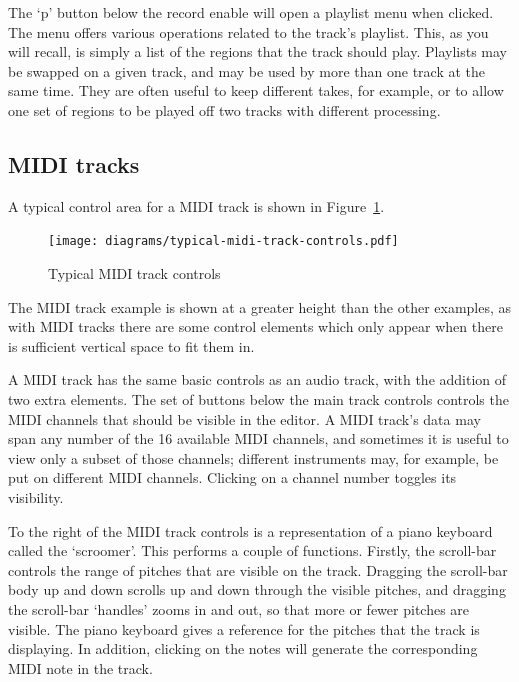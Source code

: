 \documentclass[10pt,a4paper]{book}
\newcommand{\todo}[1]{\marginpar{\small\texttt{#1}}}
\begin{document}
The `p' button below the record enable will open a playlist menu when
clicked.  The menu offers various operations related to the track's
playlist.  This, as you will recall, is simply a list of the
regions that the track should play.  Playlists may be swapped on a
given track, and may be used by more than one track at the same time.
They are often useful to keep different takes, for example, or to
allow one set of regions to be played off two tracks with different
processing.

\todo{playlist menu details}


\subsection{MIDI tracks}

A typical control area for a MIDI track is shown in Figure~\ref{fig:typical-midi-track-controls}.

\begin{figure}[ht]
\begin{center}
\texttt{[image: diagrams/typical-midi-track-controls.pdf]}
\end{center}
\caption{Typical MIDI track controls}
\label{fig:typical-midi-track-controls}
\end{figure}

The MIDI track example is shown at a greater height than the other
examples, as with MIDI tracks there are some control elements which
only appear when there is sufficient vertical space to fit them in.

A MIDI track has the same basic controls as an audio track, with the
addition of two extra elements.  The set of buttons below the main
track controls controls the MIDI channels that should be visible in
the editor.  A MIDI track's data may span any number of the 16
available MIDI channels, and sometimes it is useful to view only a
subset of those channels; different instruments may, for example, be
put on different MIDI channels.  Clicking on a channel number toggles
its visibility.

\todo{What does Force do}

To the right of the MIDI track controls is a representation of a piano
keyboard called the `scroomer'.  This performs a couple of functions.
Firstly, the scroll-bar controls the range of pitches that are visible
on the track.  Dragging the scroll-bar body up and down scrolls up and
down through the visible pitches, and dragging the scroll-bar
`handles' zooms in and out, so that more or fewer pitches are visible.
The piano keyboard gives a reference for the pitches that the track is
displaying.  In addition, clicking on the notes will generate the
corresponding MIDI note in the track.
\end{document}
